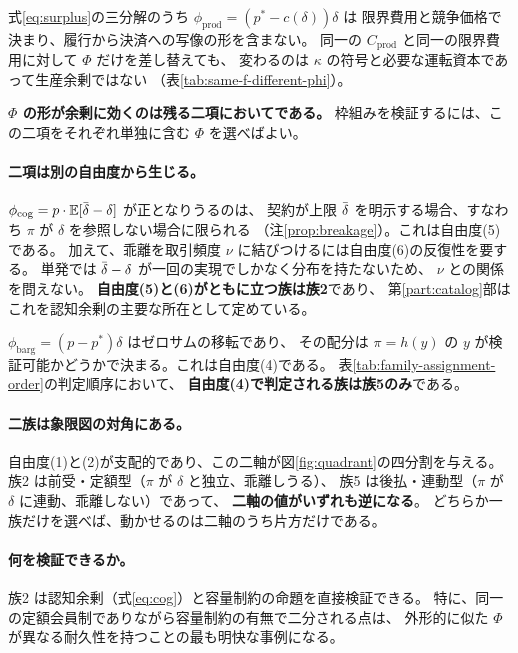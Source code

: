式\eqref{eq:surplus}の三分解のうち $\phi_{\mathrm{prod}}=(p^{\ast}-c(\delta))\delta$ は
限界費用と競争価格で決まり、履行から決済への写像の形を含まない。
同一の $C_{\mathrm{prod}}$ と同一の限界費用に対して $\Phi$ だけを差し替えても、
変わるのは $\kappa$ の符号と必要な運転資本であって生産余剰ではない
（表\ref{tab:same-f-different-phi}）。

\textbf{$\Phi$ の形が余剰に効くのは残る二項においてである。}
枠組みを検証するには、この二項をそれぞれ単独に含む $\Phi$ を選べばよい。

\paragraph{二項は別の自由度から生じる。}

$\phi_{\mathrm{cog}}=p\cdot\E[\dbar-\delta]$ が正となりうるのは、
契約が上限 $\dbar$ を明示する場合、すなわち $\pi$ が $\delta$ を参照しない場合に限られる
（注\ref{prop:breakage}）。これは自由度(5)である。
加えて、乖離を取引頻度 $\nu$ に結びつけるには自由度(6)の反復性を要する。
単発では $\dbar-\delta$ が一回の実現でしかなく分布を持たないため、
$\nu$ との関係を問えない。
\textbf{自由度(5)と(6)がともに立つ族は族2}であり、
第\ref{part:catalog}部はこれを認知余剰の主要な所在として定めている。

$\phi_{\mathrm{barg}}=(p-p^{\ast})\delta$ はゼロサムの移転であり、
その配分は $\pi=h(y)$ の $y$ が検証可能かどうかで決まる。これは自由度(4)である。
表\ref{tab:family-assignment-order}の判定順序において、
\textbf{自由度(4)で判定される族は族5のみ}である。

\paragraph{二族は象限図の対角にある。}

自由度(1)と(2)が支配的であり、この二軸が図\ref{fig:quadrant}の四分割を与える。
族2 は前受・定額型（$\pi$ が $\delta$ と独立、乖離しうる）、
族5 は後払・連動型（$\pi$ が $\delta$ に連動、乖離しない）であって、
\textbf{二軸の値がいずれも逆になる}。
どちらか一族だけを選べば、動かせるのは二軸のうち片方だけである。

\paragraph{何を検証できるか。}

族2 は認知余剰（式\eqref{eq:cog}）と容量制約の命題を直接検証できる。
特に、同一の定額会員制でありながら容量制約の有無で二分される点は、
外形的に似た $\Phi$ が異なる耐久性を持つことの最も明快な事例になる。

